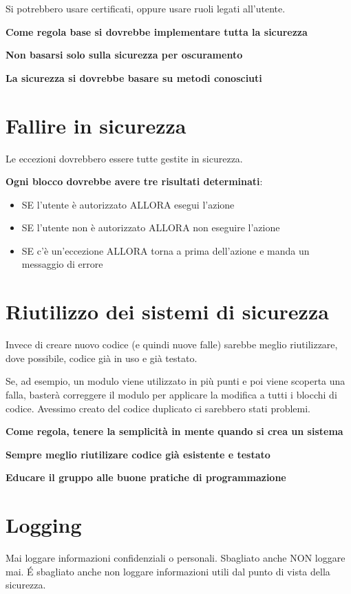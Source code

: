 \documentclass[11pt,a4paper]{book}
\begin{document}
Si potrebbero usare certificati, oppure usare ruoli legati all'utente.

\textbf{Come regola base si dovrebbe implementare tutta la sicurezza}

\textbf{Non basarsi solo sulla sicurezza per oscuramento}

\textbf{La sicurezza si dovrebbe basare su metodi conosciuti}


\section{Fallire in sicurezza}
Le eccezioni dovrebbero essere tutte gestite in sicurezza.

\textbf{Ogni blocco dovrebbe avere tre risultati determinati}:
\begin{itemize}
	\item SE l'utente è autorizzato ALLORA esegui l'azione
	\item SE l'utente non è autorizzato ALLORA non eseguire l'azione
	\item SE c'è un'eccezione ALLORA torna a prima dell'azione e manda un messaggio di errore
\end{itemize}

\section{Riutilizzo dei sistemi di sicurezza}
Invece di creare nuovo codice (e quindi nuove falle) sarebbe meglio riutilizzare, dove possibile, codice già in uso e già testato.

Se, ad esempio, un modulo viene utilizzato in più punti e poi viene scoperta una falla, basterà correggere il modulo per applicare la modifica a tutti i blocchi di codice. Avessimo creato del codice duplicato ci sarebbero stati problemi.

\textbf{Come regola, tenere la semplicità in mente quando si crea un sistema}

\textbf{Sempre meglio riutilizare codice già esistente e testato}

\textbf{Educare il gruppo alle buone pratiche di programmazione}

\section{Logging}
Mai loggare informazioni confidenziali o personali. Sbagliato anche NON loggare mai. É sbagliato anche non loggare informazioni utili dal punto di vista della sicurezza.
\end{document}
